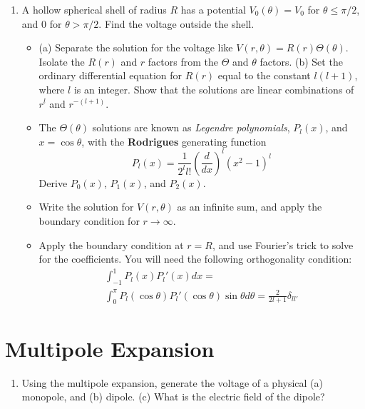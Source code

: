 \documentclass[10pt]{article}
\begin{document}
\begin{enumerate}
\item A hollow spherical shell of radius $R$ has a potential $V_0(\theta) = V_0$ for $\theta \leq \pi/2$, and $0$ for $\theta > \pi/2$.  Find the voltage outside the shell.
\begin{itemize}
\item (a) Separate the solution for the voltage like $V(r,\theta)=R(r)\Theta(\theta)$.  Isolate the $R(r)$ and $r$ factors from the $\Theta$ and $\theta$ factors. (b) Set the ordinary differential equation for $R(r)$ equal to the constant $l(l+1)$, where $l$ is an integer.  Show that the solutions are linear combinations of $r^l$ and $r^{-(l+1)}$. \\ \vspace{2.5cm}
\item The $\Theta(\theta)$ solutions are known as \textit{Legendre polynomials}, $P_l(x)$, and $x=\cos\theta$, with the \textbf{Rodrigues} generating function
\begin{equation}
P_l(x) = \frac{1}{2^ll!}\left(\frac{d}{dx}\right)^l(x^2-1)^l
\end{equation}
Derive $P_0(x)$, $P_1(x)$, and $P_2(x)$. \\ \vspace{1.5cm}
\item Write the solution for $V(r,\theta)$ as an infinite sum, and apply the boundary condition for $r\to\infty$. \\ \vspace{2cm}
\item Apply the boundary condition at $r=R$, and use Fourier's trick to solve for the coefficients.  You will need the following orthogonality condition:
\begin{multline}
\int_{-1}^{1} P_l(x) P_l'(x) dx = \\ \int_0^\pi P_l(\cos\theta)P_l'(\cos\theta)\sin\theta d\theta = \frac{2}{2l+1}\delta_{ll'}
\end{multline}
\end{itemize}
\end{enumerate} \vspace{3cm}

\section{Multipole Expansion}

\begin{enumerate}
\item Using the multipole expansion, generate the voltage of a physical (a) monopole, and (b) dipole.  (c) What is the electric field of the dipole?
\end{enumerate}
\end{document}
